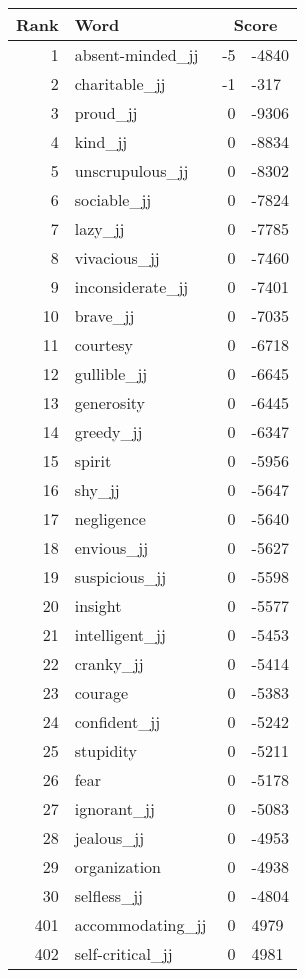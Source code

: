 \begin{longtable}[!htbp]{| rlr@{.}l |}
    \hline
    \textbf{Rank} & \textbf{Word} & \multicolumn{2}{c|}{\textbf{Score}} \\
    \hline
    \endhead
    1 & absent-minded\_jj & -5 & -4840 \\
    2 & charitable\_jj & -1 & -317 \\
    3 & proud\_jj & 0 & -9306 \\
    4 & kind\_jj & 0 & -8834 \\
    5 & unscrupulous\_jj & 0 & -8302 \\
    6 & sociable\_jj & 0 & -7824 \\
    7 & lazy\_jj & 0 & -7785 \\
    8 & vivacious\_jj & 0 & -7460 \\
    9 & inconsiderate\_jj & 0 & -7401 \\
    10 & brave\_jj & 0 & -7035 \\
    11 & courtesy & 0 & -6718 \\
    12 & gullible\_jj & 0 & -6645 \\
    13 & generosity & 0 & -6445 \\
    14 & greedy\_jj & 0 & -6347 \\
    15 & spirit & 0 & -5956 \\
    16 & shy\_jj & 0 & -5647 \\
    17 & negligence & 0 & -5640 \\
    18 & envious\_jj & 0 & -5627 \\
    19 & suspicious\_jj & 0 & -5598 \\
    20 & insight & 0 & -5577 \\
    21 & intelligent\_jj & 0 & -5453 \\
    22 & cranky\_jj & 0 & -5414 \\
    23 & courage & 0 & -5383 \\
    24 & confident\_jj & 0 & -5242 \\
    25 & stupidity & 0 & -5211 \\
    26 & fear & 0 & -5178 \\
    27 & ignorant\_jj & 0 & -5083 \\
    28 & jealous\_jj & 0 & -4953 \\
    29 & organization & 0 & -4938 \\
    30 & selfless\_jj & 0 & -4804 \\
    401 & accommodating\_jj & 0 & 4979 \\
    402 & self-critical\_jj & 0 & 4981 \\

\end{longtable}
